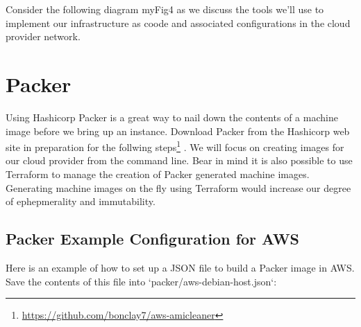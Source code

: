 Consider the following diagram {myFig4} as we discuss the tools we'll
use to implement our infrastructure as coode and associated
configurations in the cloud provider network.


\section{Packer}

\justify
Using Hashicorp Packer is a great way to nail down the contents of a
machine image before we bring up an instance. Download Packer from the
Hashicorp web site in preparation for the follwing steps\footnote{\url{https://github.com/bonclay7/aws-amicleaner}}
. We will focus on creating images for our cloud provider from the
command line. Bear in mind it is also possible to use Terraform to
manage the creation of Packer generated machine images. Generating
machine images on the fly using Terraform would increase our degree of
ephepmerality and immutability.

\subsection{Packer Example Configuration for AWS}

Here is an example of how to set up a JSON file to build a Packer image
in AWS. Save the contents of this file into
`packer/aws-debian-host.json`:

